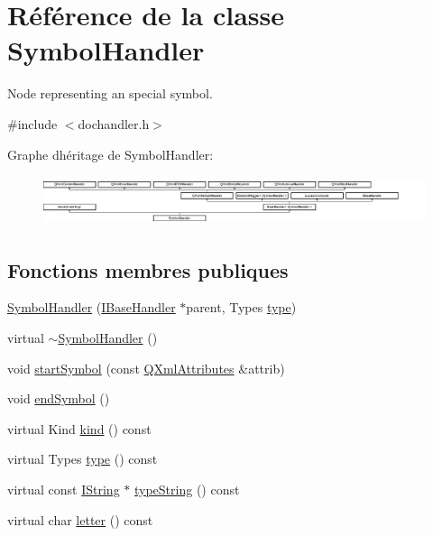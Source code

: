 \hypertarget{class_symbol_handler}{}\section{Référence de la classe Symbol\+Handler}
\label{class_symbol_handler}


Node representing an special symbol.  




{\ttfamily \#include $<$dochandler.\+h$>$}

Graphe d\textquotesingle{}héritage de Symbol\+Handler\+:\begin{figure}[H]
\begin{center}
\leavevmode
\includegraphics[height=1.467890cm]{class_symbol_handler}
\end{center}
\end{figure}
\subsection*{Fonctions membres publiques}
\begin{DoxyCompactItemize}
\item 
\hyperlink{class_symbol_handler_ab1bd4c35045cf7d7d65bf7a6eec35ccf}{Symbol\+Handler} (\hyperlink{class_i_base_handler}{I\+Base\+Handler} $\ast$parent, Types \hyperlink{class_symbol_handler_a5a3df65fdf03a7e0d097d7a3b6c77259}{type})
\item 
virtual \hyperlink{class_symbol_handler_a8bd6bd278994ce9eab1e4e12ac3e0f9e}{$\sim$\+Symbol\+Handler} ()
\item 
void \hyperlink{class_symbol_handler_a0bccc7f1ac90bdf67526895f5cbc91ab}{start\+Symbol} (const \hyperlink{class_q_xml_attributes}{Q\+Xml\+Attributes} \&attrib)
\item 
void \hyperlink{class_symbol_handler_aeabd4672a5e8c565ecea54ba5ce024d2}{end\+Symbol} ()
\item 
virtual Kind \hyperlink{class_symbol_handler_a60f657eb028e16d9042693e6962cefc1}{kind} () const 
\item 
virtual Types \hyperlink{class_symbol_handler_a5a3df65fdf03a7e0d097d7a3b6c77259}{type} () const 
\item 
virtual const \hyperlink{class_i_string}{I\+String} $\ast$ \hyperlink{class_symbol_handler_aaa1d435398e66d67b639484f1901121d}{type\+String} () const 
\item 
virtual char \hyperlink{class_symbol_handler_a3ec6b6628b8ce23978c867c552bf2998}{letter} () const 
\end{DoxyCompactItemize}
